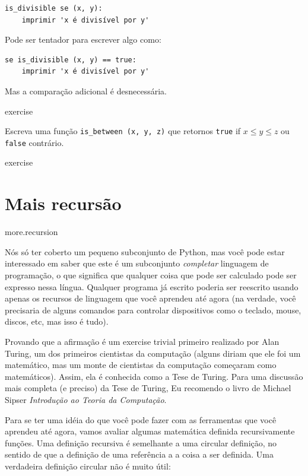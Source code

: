 \documentclass[10pt]{book}
\begin{document}
\begin{exercise}
{{{\begin{verbatim}
is_divisible se (x, y):
    imprimir 'x é divisível por y'
\end{verbatim}
%
Pode ser tentador para escrever algo como:

\begin{verbatim}
se is_divisible (x, y) == true:
    imprimir 'x é divisível por y'
\end{verbatim}
%
Mas a comparação adicional é desnecessária.

\begin{} exercise

Escreva uma função \verb "is_between (x, y, z)" que
retornos {\tt true} if $ x \le y \le z $ ou {\tt false} contrário.

\end{} exercise


\section{Mais recursão}
\label{} more.recursion

Nós só ter coberto um pequeno subconjunto de Python, mas você pode
estar interessado em saber que este é um subconjunto {\em completar}
linguagem de programação, o que significa que qualquer coisa que pode ser
calculado pode ser expresso nessa língua. Qualquer programa já escrito
poderia ser reescrito usando apenas os recursos de linguagem que você aprendeu
até agora (na verdade, você precisaria de alguns comandos para controlar dispositivos
como o teclado, mouse, discos, etc, mas isso é tudo).

Provando que a afirmação é um exercise trivial primeiro realizado por Alan
Turing, um dos primeiros cientistas da computação (alguns diriam que ele
foi um matemático, mas um monte de cientistas da computação começaram como
matemáticos). Assim, ela é conhecida como a Tese de Turing.
Para uma discussão mais completa (e preciso) da Tese de Turing,
Eu recomendo o livro de Michael Sipser {\em Introdução ao
Teoria da Computação}.

Para se ter uma idéia do que você pode fazer com as ferramentas que você aprendeu
até agora, vamos avaliar algumas matemática definida recursivamente
funções. Uma definição recursiva é semelhante a uma circular
definição, no sentido de que a definição de uma referência a
a coisa a ser definida. Uma verdadeira definição circular não é muito
útil:

}}}
\end{exercise}
\end{document}
